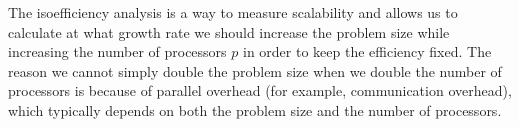 \documentclass[a4paper, 11pt]{article}
\begin{document}
\begin{small}
The isoefficiency analysis is a way to measure scalability and allows us to calculate at what growth rate we should increase the problem size while increasing the number of processors $p$
in order to keep the efficiency fixed. The reason we cannot simply double the problem size when we double the number of processors is because of parallel overhead
(for example, communication overhead), which typically depends on both the problem size and the number of processors\cite{Grama_Gupta_Kumar}. 


\end{small}
\end{document}
